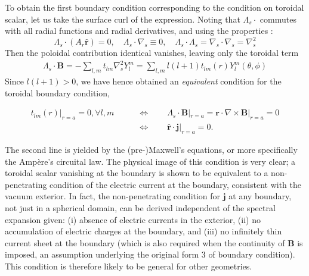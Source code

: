 To obtain the first boundary condition corresponding to the condition on toroidal scalar, let us take the surface curl of the expression. Noting that $\Lambda_s\cdot $ commutes with all radial functions and radial derivatives, and using the properties \citep[see e.g.][]{backus_poloidal_1986}:
%
\begin{equation}
    \Lambda_s \cdot (A_r \hat{\mathbf{r}}) = 0,\quad 
    \Lambda_s \cdot \nabla_s \equiv 0,\quad 
    \Lambda_s \cdot \Lambda_s = \nabla_s\cdot \nabla_s = \nabla_s^2
\end{equation}
%
Then the poloidal contribution identical vanishes, leaving only the toroidal term
%
\begin{equation}
\begin{aligned}
    \Lambda_s\cdot \mathbf{B} = - \sum_{l,m} t_{lm} \nabla_s^2 Y_l^m = \sum_{l,m} l(l+1) t_{lm}(r) Y_l^m(\theta, \phi)
\end{aligned}
\end{equation}
%
Since $l(l+1) > 0$, we have hence obtained an \textit{equivalent} condition for the toroidal boundary condition,
%
\begin{mdframed}[style=HighlightBox, frametitle={Vacuum exterior boundary condition I, equivalent to the toroidal condition}]
    \begin{equation}
        \begin{aligned}
        t_{lm}(r)|_{r=a} = 0, \forall l,m \qquad &\Longleftrightarrow \qquad 
        \Lambda_s\cdot \mathbf{B}|_{r=a} = \mathbf{r}\cdot \nabla\times \mathbf{B}|_{r=a} = 0 \\
        &\Longleftrightarrow \qquad \hat{\mathbf{r}} \cdot \mathbf{j}|_{r=a} = 0.
        \end{aligned}
    \end{equation}
\end{mdframed}
%
The second line is yielded by the (pre-)Maxwell's equations, or more specifically the Ampère's circuital law. The physical image of this condition is very clear; a toroidal scalar vanishing at the boundary is shown to be equivalent to a non-penetrating condition of the electric current at the boundary, consistent with the vacuum exterior. In fact, the non-penetrating condition for $\mathbf{j}$ at any boundary, not just in a spherical domain, can be derived independent of the spectral expansion given: (i) absence of electric currents in the exterior, (ii) no accumulation of electric charges at the boundary, and (iii) no infinitely thin current sheet at the boundary (which is also required when the continuity of $\mathbf{B}$ is imposed, an assumption underlying the original form 3 of boundary condition). This condition is therefore likely to be general for other geometries.

